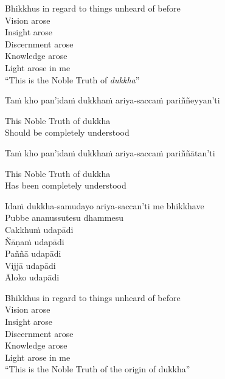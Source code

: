 \begin{english-verses}
  Bhikkhus in regard to things unheard of before\\
  Vision arose\\
  Insight arose\\
  Discernment arose\\
  Knowledge arose\\
  Light arose in me\ifdigitalversion\makeatletter\hyperlink{endnote55-appendix}\makeatother\\\fi
  ``This is the Noble Truth of \textit{dukkha}''
\end{english-verses}

Taṁ kho pan'idaṁ dukkhaṁ ariya-saccaṁ pariññeyyan'ti

\begin{english}
  This Noble Truth of dukkha\ifdigitalversion\makeatletter\hyperlink{endnote56-appendix}\makeatother\\\fi
  Should be completely understood
\end{english}

Taṁ kho pan'idaṁ dukkhaṁ ariya-saccaṁ pariññātan'ti

\begin{english}
  This Noble Truth of dukkha\\
  Has been completely understood
\end{english}

Idaṁ dukkha-samudayo ariya-saccan'ti me bhikkhave\\
Pubbe ananussutesu dhammesu\\
Cakkhuṁ udapādi\\
Ñāṇaṁ udapādi\\
Paññā udapādi\\
Vijjā udapādi\\
Āloko udapādi

\begin{english-verses}
  Bhikkhus in regard to things unheard of before\\
  Vision arose\\
  Insight arose\\
  Discernment arose\\
  Knowledge arose\\
  Light arose in me\\
  ``This is the Noble Truth of the origin of dukkha''
\end{english-verses}

